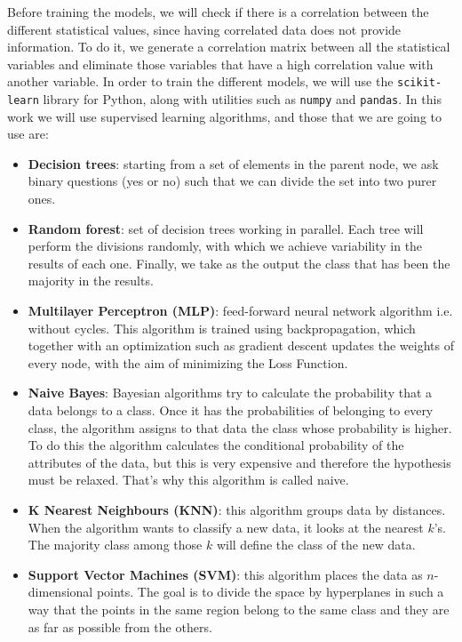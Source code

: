 Before training the models, we will check if there is a correlation between the different statistical values, since having correlated data does not provide information. To do it, we generate a correlation matrix between all the statistical variables and eliminate those variables that have a high correlation value with another variable. In order to train the different models, we will use the \texttt{scikit-learn} library for Python, along with utilities such as \texttt{numpy} and \texttt{pandas}. In this work we will use supervised learning algorithms, and those that we are going to use are:
\begin{itemize}
    \item \textbf{Decision trees}: starting from a set of elements in the parent node, we ask binary questions (yes or no) such that we can divide the set into two purer ones.
    \item \textbf{Random forest}: set of decision trees working in parallel. Each tree will perform the divisions randomly, with which we achieve variability in the results of each one. Finally, we take as the output the class that has been the majority in the results. 
    \item \textbf{Multilayer Perceptron (MLP)}: feed-forward neural network algorithm i.e. without cycles. This algorithm is trained using backpropagation, which together with an optimization such as gradient descent updates the weights of every node, with the aim of minimizing the Loss Function. 
    \item \textbf{Naive Bayes}: Bayesian algorithms try to calculate the probability that a data belongs to a class. Once it has the probabilities of belonging to every class, the algorithm assigns to that data the class whose probability is higher. To do this the algorithm calculates the conditional probability of the attributes of the data, but this is very expensive and therefore the hypothesis must be relaxed. That's why this algorithm is called naive. 
    \item \textbf{K Nearest Neighbours (KNN)}: this algorithm groups data by distances. When the algorithm wants to classify a new data, it looks at the nearest $k$'s. The majority class among those $k$ will define the class of the new data.
    \item \textbf{Support Vector Machines (SVM)}: this algorithm places the data as $n$-dimensional points. The goal is to divide the space by hyperplanes in such a way that the points in the same region belong to the same class and they are as far as possible from the others.
\end{itemize}


